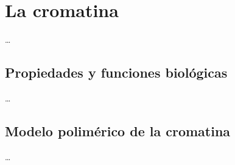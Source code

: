 \chapter{La cromatina}
\label{cap:chromatin}

\dots

\section{Propiedades y funciones biológicas}

\dots

\section{Modelo polimérico de la cromatina}

\dots
